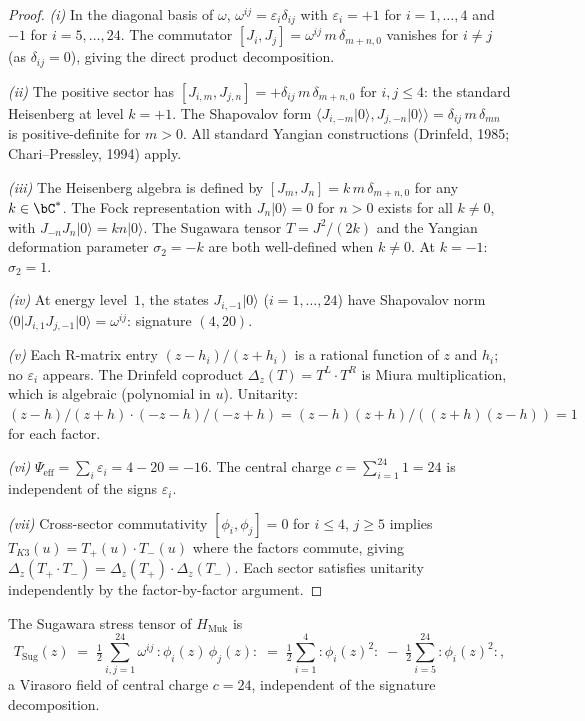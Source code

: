 \begin{proof}
\emph{(i)} In the diagonal basis of $\omega$,
$\omega^{ij} = \varepsilon_i \delta_{ij}$ with
$\varepsilon_i = +1$ for $i = 1,\ldots,4$ and $-1$ for $i = 5,\ldots,24$.
The commutator $[J_i, J_j] = \omega^{ij}\, m\, \delta_{m+n,0}$
vanishes for $i \neq j$ (as $\delta_{ij} = 0$), giving the direct product
decomposition.

\emph{(ii)} The positive sector has $[J_{i,m}, J_{j,n}] = +\delta_{ij}\,
m\, \delta_{m+n,0}$ for $i,j \leq 4$: the standard Heisenberg at level
$k = +1$. The Shapovalov form
$\langle J_{i,-m}\lvert 0\rangle, J_{j,-n}\lvert 0\rangle\rangle
= \delta_{ij}\, m\, \delta_{mn}$
is positive-definite for $m > 0$. All standard Yangian constructions
(Drinfeld, 1985; Chari--Pressley, 1994) apply.

\emph{(iii)} The Heisenberg algebra is defined by
$[J_m, J_n] = k\, m\, \delta_{m+n,0}$ for any $k \in \bC^*$.
The Fock representation with $J_n \lvert 0\rangle = 0$ for $n > 0$ exists
for all $k \neq 0$, with $J_{-n} J_n \lvert 0\rangle = kn\lvert 0\rangle$.
The Sugawara tensor $T = J^2/(2k)$ and the Yangian deformation parameter
$\sigma_2 = -k$ are both well-defined when $k \neq 0$. At $k = -1$:
$\sigma_2 = 1$.

\emph{(iv)} At energy level~$1$, the states $J_{i,-1}\lvert 0\rangle$
($i = 1,\ldots,24$) have Shapovalov norm
$\langle 0\rvert J_{i,1} J_{j,-1}\lvert 0\rangle = \omega^{ij}$:
signature $(4,20)$.

\emph{(v)} Each R-matrix entry $(z-h_i)/(z+h_i)$ is a rational function
of $z$ and $h_i$; no $\varepsilon_i$ appears. The Drinfeld coproduct
$\Delta_z(T) = T^L \cdot T^R$ is Miura multiplication, which is
algebraic (polynomial in $u$). Unitarity:
$(z-h)/(z+h) \cdot (-z-h)/(-z+h) = (z-h)(z+h)/((z+h)(z-h)) = 1$
for each factor.

\emph{(vi)} $\Psi_{\mathrm{eff}} = \sum_i \varepsilon_i = 4 - 20 = -16$.
The central charge $c = \sum_{i=1}^{24} 1 = 24$ is independent
of the signs $\varepsilon_i$.

\emph{(vii)} Cross-sector commutativity $[\phi_i, \phi_j] = 0$ for
$i \leq 4$, $j \geq 5$ implies $T_{K3}(u) = T_+(u) \cdot T_-(u)$
where the factors commute, giving
$\Delta_z(T_+ \cdot T_-) = \Delta_z(T_+) \cdot \Delta_z(T_-)$.
Each sector satisfies unitarity independently by the factor-by-factor
argument.
\end{proof}

\begin{lemma}[Sugawara stress tensor on the K3 Heisenberg at \texorpdfstring{$c = 24$}{c = 24}]
\label{lem:k3-sugawara-stress}
The Sugawara stress tensor of $H_{\mathrm{Muk}}$ is
\[
 T_{\mathrm{Sug}}(z) \;=\; \tfrac{1}{2}\sum_{i, j = 1}^{24} \omega^{ij}\, {:}\phi_i(z)\, \phi_j(z){:}
 \;=\; \tfrac{1}{2}\sum_{i = 1}^{4} {:}\phi_i(z)^2{:} \;-\; \tfrac{1}{2}\sum_{i = 5}^{24} {:}\phi_i(z)^2{:},
\]
a Virasoro field of central charge $c = 24$, independent of the
signature decomposition.
\end{lemma}

